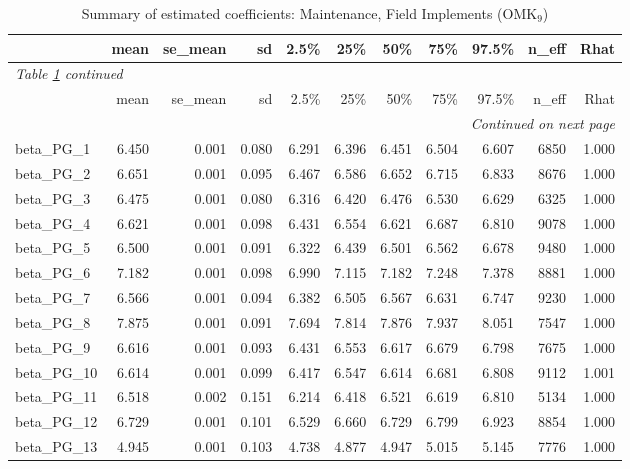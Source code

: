 \documentclass[12pt]{article}
\begin{document}
\begingroup
\footnotesize
\setlength{\tabcolsep}{3pt}
\begin{longtable}{lrrrrrrrrrr}
\caption{Summary of estimated coefficients: Maintenance, Field Implements (OMK$_\text{9}$)}
\label{tab:coef_summary_omk9} \\
\toprule
 & mean & se\_mean & sd & 2.5\% & 25\% & 50\% & 75\% & 97.5\% & n\_eff & Rhat \\
\midrule
\endfirsthead
\multicolumn{11}{l}{\textit{Table \ref{tab:coef_summary_omk9} continued}} \\
\toprule
 & mean & se\_mean & sd & 2.5\% & 25\% & 50\% & 75\% & 97.5\% & n\_eff & Rhat \\
\midrule
\endhead
\midrule
\multicolumn{11}{r}{\textit{Continued on next page}} \\
\endfoot
\bottomrule
\endlastfoot
beta\_PG\_1  &  6.450 & 0.001 & 0.080 &  6.291 &  6.396 &  6.451 &  6.504 &  6.607 &  6850 & 1.000 \\
beta\_PG\_2  &  6.651 & 0.001 & 0.095 &  6.467 &  6.586 &  6.652 &  6.715 &  6.833 &  8676 & 1.000 \\
beta\_PG\_3  &  6.475 & 0.001 & 0.080 &  6.316 &  6.420 &  6.476 &  6.530 &  6.629 &  6325 & 1.000 \\
beta\_PG\_4  &  6.621 & 0.001 & 0.098 &  6.431 &  6.554 &  6.621 &  6.687 &  6.810 &  9078 & 1.000 \\
beta\_PG\_5  &  6.500 & 0.001 & 0.091 &  6.322 &  6.439 &  6.501 &  6.562 &  6.678 &  9480 & 1.000 \\
beta\_PG\_6  &  7.182 & 0.001 & 0.098 &  6.990 &  7.115 &  7.182 &  7.248 &  7.378 &  8881 & 1.000 \\
beta\_PG\_7  &  6.566 & 0.001 & 0.094 &  6.382 &  6.505 &  6.567 &  6.631 &  6.747 &  9230 & 1.000 \\
beta\_PG\_8  &  7.875 & 0.001 & 0.091 &  7.694 &  7.814 &  7.876 &  7.937 &  8.051 &  7547 & 1.000 \\
beta\_PG\_9  &  6.616 & 0.001 & 0.093 &  6.431 &  6.553 &  6.617 &  6.679 &  6.798 &  7675 & 1.000 \\
beta\_PG\_10 &  6.614 & 0.001 & 0.099 &  6.417 &  6.547 &  6.614 &  6.681 &  6.808 &  9112 & 1.001 \\
beta\_PG\_11 &  6.518 & 0.002 & 0.151 &  6.214 &  6.418 &  6.521 &  6.619 &  6.810 &  5134 & 1.000 \\
beta\_PG\_12 &  6.729 & 0.001 & 0.101 &  6.529 &  6.660 &  6.729 &  6.799 &  6.923 &  8854 & 1.000 \\
beta\_PG\_13 &  4.945 & 0.001 & 0.103 &  4.738 &  4.877 &  4.947 &  5.015 &  5.145 &  7776 & 1.000 \\

\end{longtable}
\end{document}
